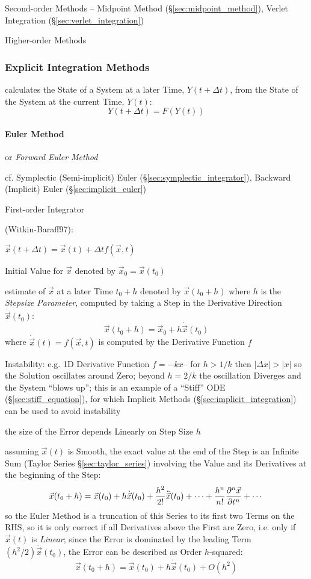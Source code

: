Second-order Methods -- Midpoint Method (\S\ref{sec:midpoint_method}), Verlet
Integration (\S\ref{sec:verlet_integration})

Higher-order Methods



\subsubsection{Explicit Integration Methods}\label{sec:explicit_integration}

calculates the State of a System at a later Time, $Y(t + \Delta{t})$, from the
State of the System at the current Time, $Y(t)$:
\[
  Y(t + \Delta{t}) = F(Y(t))
\]



\paragraph{Euler Method}\label{sec:euler_method}\hfill

or \emph{Forward Euler Method}

\fist cf. Symplectic (Semi-implicit) Euler (\S\ref{sec:symplectic_integrator}),
Backward (Implicit) Euler (\S\ref{sec:implicit_euler})

First-order Integrator

(Witkin-Baraff97):

$\vec{x}(t + \Delta{t}) = \vec{x}(t) + \Delta{t}f(\vec{x},t)$

Initial Value for $\vec{x}$ denoted by $\vec{x}_0 = \vec{x}(t_0)$

estimate of $\vec{x}$ at a later Time $t_0 + h$ denoted by $\vec{x}(t_0 + h)$
where $h$ is the \emph{Stepsize Parameter}, computed by taking a Step in the
Derivative Direction $\dot{\vec{x}}(t_0)$:
\[
  \vec{x}(t_0 + h) = \vec{x}_0 + h\dot{\vec{x}}(t_0)
\]
where $\dot{\vec{x}}(t) = f(\vec{x}, t)$ is computed by the Derivative Function
$f$

Instability: e.g. 1D Derivative Function $f = -kx$-- for $h > 1/k$ then
$|\Delta{x}| > |x|$ so the Solution oscillates around Zero; beyond $h = 2/k$ the
oscillation Diverges and the System ``blows up''; this is an example of a
``Stiff'' ODE (\S\ref{sec:stiff_equation}), for which Implicit Methods
(\S\ref{sec:implicit_integration}) can be used to avoid instability

the size of the Error depends Linearly on Step Size $h$

assuming $\vec{x}(t)$ is Smooth, the exact value at the end of the Step is an
Infinite Sum (Taylor Series \S\ref{sec:taylor_series}) involving the Value and
its Derivatives at the beginning of the Step:
\[
  \vec{x}(t_0 + h) = \vec{x}(t_0) + h\dot{\vec{x}}(t_0) +
    \frac{h^2}{2!}\ddot{\vec{x}}(t_0) + \cdots +
    \frac{h^n}{n!}\frac{\partial{^n\vec{x}}}{\partial{t^n}} + \cdots
\]
so the Euler Method is a truncation of this Series to its first two Terms on the
RHS, so it is only correct if all Derivatives above the First are Zero, i.e.
only if $\vec{x}(t)$ is \emph{Linear}; since the Error is dominated by the
leading Term $(h^2/2)\ddot{\vec{x}}(t_0)$, the Error can be described as Order
$h$-squared:
\[
  \vec{x}(t_0 + h) = \vec{x}(t_0) + h\dot{\vec{x}}(t_0) + O(h^2)
\]

